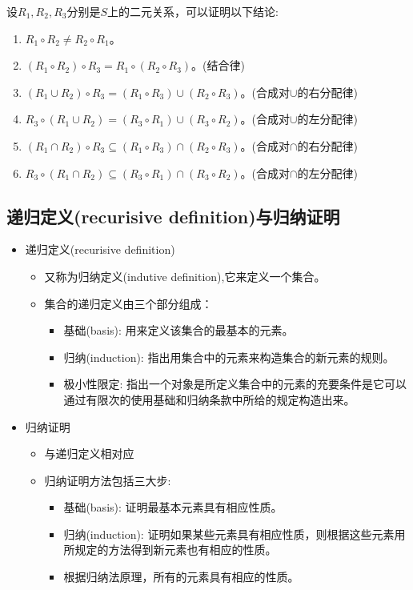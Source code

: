 设$R_1,R_2,R_3$分别是$S$上的二元关系，可以证明以下结论:
\begin{enumerate}
	\item $R_1\circ R_2\ne R_2\circ R_1$。
	\item $(R_1\circ R_2)\circ R_3 = R_1\circ (R_2\circ R_3)$。(结合律)
	\item $(R_1\cup R_2)\circ R_3 = (R_1\circ R_3)\cup(R_2\circ R_3)$。(合成对$\cup$的右分配律)
	\item $R_3\circ(R_1\cup R_2) = (R_3\circ R_1)\cup(R_3\circ R_2)$。(合成对$\cup$的左分配律)
	\item $(R_1\cap R_2)\circ R_3\subseteq(R_1\circ R_3)\cap(R_2\circ R_3)$。(合成对$\cap$的右分配律)
	\item $R_3\circ(R_1\cap R_2)\subseteq(R_3\circ R_1)\cap(R_3\circ R_2)$。(合成对$\cap$的左分配律)
\end{enumerate}

\subsection{递归定义(recurisive definition)与归纳证明}
\begin{itemize}
	\item 递归定义(recurisive definition)
	\begin{itemize}
		\item 又称为归纳定义(indutive definition),它来定义一个集合。
		\item 集合的递归定义由三个部分组成：
		\begin{itemize}
			\item 基础(basis): 用来定义该集合的最基本的元素。
			\item 归纳(induction): 指出用集合中的元素来构造集合的新元素的规则。
			\item 极小性限定: 指出一个对象是所定义集合中的元素的充要条件是它可以通过有限次的使用基础和归纳条款中所给的规定构造出来。
		\end{itemize}
	\end{itemize}
    \item 归纳证明
    \begin{itemize}
    	\item 与递归定义相对应
    	\item 归纳证明方法包括三大步:
    	\begin{itemize}
    		\item 基础(basis): 证明最基本元素具有相应性质。
    		\item 归纳(induction): 证明如果某些元素具有相应性质，则根据这些元素用所规定的方法得到新元素也有相应的性质。
    		\item 根据归纳法原理，所有的元素具有相应的性质。
    	\end{itemize}
    \end{itemize}
\end{itemize}


